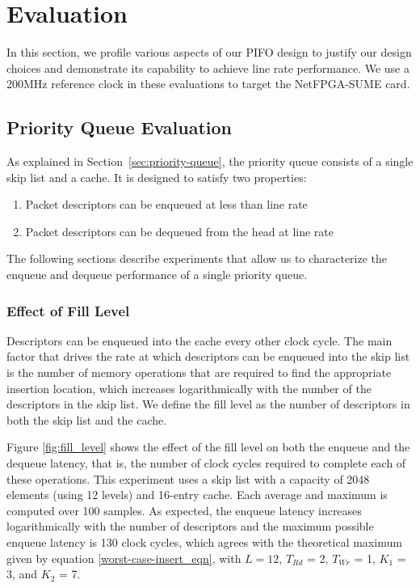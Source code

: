 \section{Evaluation}

In this section, we profile various aspects of our PIFO design to justify our design choices and demonstrate its capability to achieve line rate performance. We use a  200MHz reference clock in these evaluations to target the NetFPGA-SUME card.

\subsection{Priority Queue Evaluation}

As explained in Section~\ref{sec:priority-queue}, the priority queue consists of a single skip list and a cache. It is designed to satisfy two properties:
\begin{enumerate}
  \item Packet descriptors can be enqueued at less than line rate
  \item Packet descriptors can be dequeued from the head at line rate
\end{enumerate}

The following sections describe experiments that allow us to characterize the enqueue and dequeue performance of a single priority queue.

\subsubsection*{Effect of Fill Level}
Descriptors can be enqueued into the cache every other clock cycle. The main factor that drives the rate at which descriptors can be enqueued into the skip list is the number of memory operations that are required to find the appropriate insertion location, which increases logarithmically with the number of the descriptors in the skip list. We define the fill level as the number of descriptors in both the skip list and the cache.

Figure \ref{fig:fill_level} shows the effect of the fill level on both the enqueue and the dequeue latency, that is, the number of clock cycles required to complete each of these operations. This experiment uses a skip list with a capacity of 2048 elements (using 12 levels) and 16-entry cache. Each average and maximum is computed over 100 samples. As expected, the enqueue latency increases logarithmically with the number of descriptors and the maximum possible enqueue latency is 130 clock cycles, which agrees with the theoretical maximum given by equation \ref{worst-case-insert_eqn}, with $L = 12$, $T_{Rd}$ = 2, $T_{Wr}$ = 1, $K_{1}$ = 3, and $K_{2}$ = 7.

